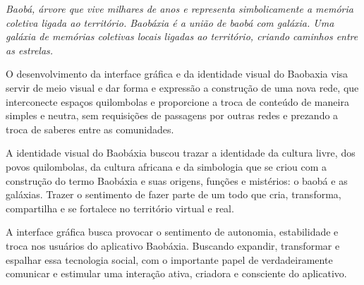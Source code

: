 \emph{Baobá, árvore que vive milhares de anos e representa simbolicamente
a memória coletiva ligada ao território. Baobáxia é a união de baobá com
galáxia. Uma galáxia de memórias coletivas locais ligadas ao território,
criando caminhos entre as estrelas.}

O desenvolvimento da interface gráfica e da identidade visual do Baobaxia
visa servir de meio visual e dar forma e expressão a construção de uma
nova rede, que interconecte espaços quilombolas e proporcione a troca de
conteúdo de maneira simples e neutra, sem requisições de passagens por
outras redes e prezando a troca de saberes entre as comunidades.

A identidade visual do Baobáxia buscou trazar a identidade da cultura livre,
dos povos quilombolas, da cultura africana e da simbologia que se criou com
a construção do termo Baobáxia e suas origens, funções e mistérios: o baobá
e as galáxias. Trazer o sentimento de fazer parte de um todo que cria,
transforma, compartilha e se fortalece no território virtual e real.

A interface gráfica busca provocar o sentimento de autonomia, estabilidade
e troca nos usuários do aplicativo Baobáxia. Buscando expandir, transformar
e espalhar essa tecnologia social, com o importante papel de verdadeiramente
comunicar e estimular uma interação ativa, criadora e consciente do
aplicativo. 


